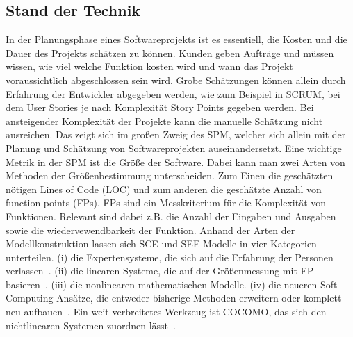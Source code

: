 \subsection{Stand der Technik}
In der Planungsphase eines Softwareprojekts ist es essentiell, die Kosten und die Dauer des Projekts schätzen zu können. Kunden geben Aufträge und müssen wissen, wie viel welche Funktion kosten wird und wann das Projekt voraussichtlich abgeschlossen sein wird. Grobe Schätzungen können allein durch Erfahrung der Entwickler abgegeben werden, wie zum Beispiel in SCRUM, bei dem User Stories je nach Komplexität Story Points gegeben werden. Bei ansteigender Komplexität der Projekte kann die manuelle Schätzung nicht ausreichen. Das zeigt sich im großen Zweig des SPM, welcher sich allein mit der Planung und Schätzung von Softwareprojekten auseinandersetzt. Eine wichtige Metrik in der SPM ist die Größe der Software. Dabei kann man zwei Arten von Methoden der Größenbestimmung unterscheiden. Zum Einen die geschätzten nötigen Lines of Code (LOC) und zum anderen die geschätzte Anzahl von function points (FPs). FPs sind ein Messkriterium für die Komplexität von Funktionen. Relevant sind dabei z.B. die Anzahl der Eingaben und Ausgaben sowie die wiedervewendbarkeit der Funktion. Anhand der Arten der Modellkonstruktion lassen sich SCE und SEE Modelle in vier Kategorien unterteilen. (i) die Expertensysteme, die sich auf die Erfahrung der Personen verlassen~\cite{Heemstra1992}. (ii) die linearen Systeme, die auf der Größenmessung mit FP basieren~\cite{Matson1994}. (iii) die nonlinearen mathematischen Modelle. (iv) die neueren Soft-Computing Ansätze, die entweder bisherige Methoden erweitern oder komplett neu aufbauen~\cite{Huang2007}\cite{Huang2006}. Ein weit verbreitetes Werkzeug ist COCOMO, das sich den nichtlinearen Systemen zuordnen lässt~\cite{Jain2016}.
\vspace{4.0cm}
